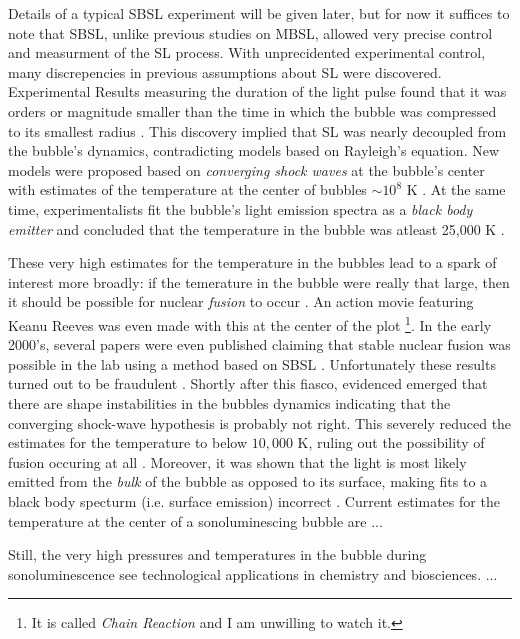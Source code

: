 \documentclass[rmp,aps,nofootinbib,superscriptaddress,floatfix,10pt]{revtex4-2}
\begin{document}
Details of a typical SBSL experiment will be given later, but for now it suffices to note that SBSL, unlike previous studies on MBSL, allowed very precise control and measurment of the SL process. With unprecidented experimental control, many discrepencies in previous assumptions about SL were discovered. Experimental Results measuring the duration of the light pulse found that it was orders or magnitude smaller than the time in which the bubble was compressed to its smallest radius \cite{barber1992resolving,barber1991observation}. This discovery implied that SL was nearly decoupled from the bubble's dynamics, contradicting models based on Rayleigh's equation. New models were proposed based on \emph{converging shock waves} at the bubble's center with estimates of the temperature at the center of bubbles $\sim10^8$ K \cite{wu1993shock,greenspan1993sonoluminescence}. At the same time, experimentalists fit the bubble's light emission spectra as a \emph{black body emitter} and concluded that the temperature in the bubble was atleast 25,000 K \cite{hiller1992spectrum}.

These very high estimates for the temperature in the bubbles lead to a spark of interest more broadly: if the temerature in the bubble were really that large, then it should be possible for nuclear \emph{fusion} to occur \cite{}. An action movie featuring Keanu Reeves was even made with this at the center of the plot \footnote{It is called \emph{Chain Reaction} and I am unwilling to watch it.}. In the early 2000's, several papers were even published claiming that stable nuclear fusion was possible in the lab using a method based on SBSL \cite{}. Unfortunately these results turned out to be fraudulent \cite{}. Shortly after this fiasco, evidenced emerged that there are shape instabilities in the bubbles dynamics indicating that the converging shock-wave hypothesis is probably not right. This severely reduced the estimates for the temperature to below $10,000$ K, ruling out the possibility of fusion occuring at all \cite{}. Moreover, it was shown that the light is most likely emitted from the \emph{bulk} of the bubble as opposed to its surface, making fits to a black body specturm (i.e. surface emission) incorrect \cite{}. Current estimates for the temperature at the center of a sonoluminescing bubble are $...$ \cite{}

Still, the very high pressures and temperatures in the bubble during sonoluminescence see technological applications in chemistry and biosciences. ...
\end{document}
